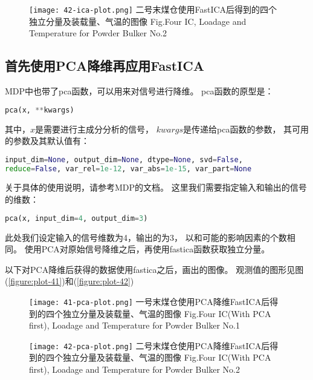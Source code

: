 \begin{figure}[!h]
   \centering
   \texttt{[image: 42-ica-plot.png]}
				    {二号末煤仓使用FastICA后得到的四个独立分量及装载量、气温的图像}
			{Fig.}{Four IC, Loadage and Temperature for Powder Bulker No.2}
\end{figure}


\subsection{首先使用PCA降维再应用FastICA}
MDP中也带了pca函数，可以用来对信号进行降维。
pca函数的原型是：
\begin{lstlisting}[language=Python, basicstyle=\ttfamily]
pca(x, **kwargs)
\end{lstlisting}
其中，$x$是需要进行主成分分析的信号，
$kwargs$是传递给pca函数的参数，
其可用的参数及其默认值有：
\begin{lstlisting}[language=Python, basicstyle=\ttfamily]
input_dim=None, output_dim=None, dtype=None, svd=False, 
reduce=False, var_rel=1e-12, var_abs=1e-15, var_part=None
\end{lstlisting}
关于具体的使用说明，请参考MDP的文档。
这里我们需要指定输入和输出的信号的维数：
\begin{lstlisting}[language=Python, basicstyle=\ttfamily]
pca(x, input_dim=4, output_dim=3)
\end{lstlisting}
此处我们设定输入的信号维数为4，输出的为3，
以和可能的影响因素的个数相同。
使用PCA对原始信号降维之后，再使用fastica函数获取独立分量。

以下对PCA降维后获得的数据使用fastica之后，画出的图像。
观测值的图形见图(\ref{figure:plot-41})和(\ref{figure:plot-42})

\begin{figure}[!h]
   \centering
   \texttt{[image: 41-pca-plot.png]}
				    {一号末煤仓使用PCA降维FastICA后得到的四个独立分量及装载量、气温的图像}
			{Fig.}{Four IC(With PCA first), Loadage and Temperature for Powder Bulker No.1}
\end{figure}

\begin{figure}[!h]
   \centering
   \texttt{[image: 42-pca-plot.png]}
				    {二号末煤仓使用PCA降维FastICA后得到的四个独立分量及装载量、气温的图像}
			{Fig.}{Four IC(With PCA first), Loadage and Temperature for Powder Bulker No.2}
\end{figure}


